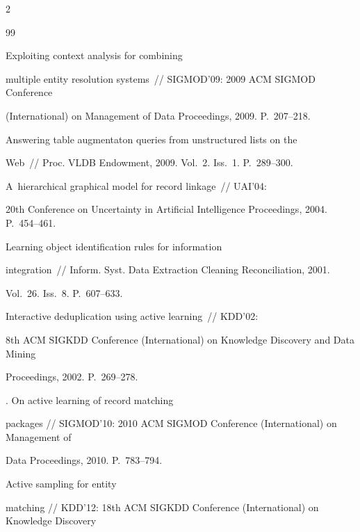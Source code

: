 \begin{multicols}{2}
{{\begin{thebibliography}{99}

 Exploiting context analysis for combining

multiple entity resolution systems~// SIGMOD'09: 2009 ACM SIGMOD Conference

(International) on Management of Data Proceedings, 2009. P.~207--218.


 Answering table augmentaton queries from unstructured lists on the

Web~// Proc. VLDB Endowment, 2009. Vol.~2. Iss.~1. P.~289--300.


 A~hierarchical graphical model for record linkage~// UAI'04:

20th Conference on Uncertainty in Artificial Intelligence Proceedings, 2004. P.~454--461.




 Learning object identification rules for information

integration~// Inform. Syst. Data Extraction Cleaning Reconciliation, 2001.

Vol.~26. Iss.~8. P.~607--633.




 Interactive deduplication using active learning~// KDD'02:

8th ACM SIGKDD Conference (International) on Knowledge Discovery and Data Mining

Proceedings, 2002. P.~269--278.




. On active learning of record matching

packages // SIGMOD'10: 2010 ACM SIGMOD Conference (International) on Management of

Data Proceedings, 2010. P.~783--794.


 Active sampling for entity

matching // KDD'12: 18th ACM SIGKDD  Conference (International) on Knowledge Discovery


\end{thebibliography}}}
\end{multicols}
